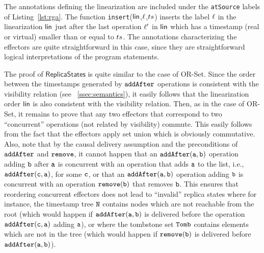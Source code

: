 The annotations defining the linearization are included under the
\lstinline|atSource| labels of Listing~\ref{lst:rga}. The function {\tt insert}($\mathsf{lin}$,$\ell$,$ts$) inserts the label $\ell$ in the linearization $\mathsf{lin}$ just after the last operation $\ell'$ in $\mathsf{lin}$ which has a timestamp (real or virtual) smaller than or equal to $ts$. The annotations characterizing the effectors are quite straightforward in this case, since they are straightforward logical interpretations of the program statements.

The proof of $\mathsf{ReplicaStates}$ is quite similar to the case of
OR-Set. Since the order between the timestamps generated by ${\tt
  addAfter}$ operations is consistent with the visibility relation
(see \sectionautorefname~\ref{ssec:semantics}), it easily follows that
the linearization order $\mathsf{lin}$ is also consistent with the
visibility relation. Then, as in the case of OR-Set, it remains to
prove that any two effectors that correspond to two ``concurrent''
operations (not related by visibility) commute. This easily follows
from the fact that the effectors apply set union which is obviously
commutative. Also, note that by the causal delivery assumption and the
preconditions of ${\tt addAfter}$ and ${\tt remove}$, it cannot happen
that an $\alabelshort[{\tt addAfter}]{a,b}$ operation adding ${\tt b}$
after ${\tt a}$ is concurrent with an operation that adds ${\tt a}$ to
the list, i.e., $\alabelshort[{\tt addAfter}]{c,a}$, for some ${\tt
  c}$, or that an $\alabelshort[{\tt addAfter}]{a,b}$ operation adding
${\tt b}$ is concurrent with an operation $\alabelshort[{\tt
  remove}]{b}$ that removes ${\tt b}$. This ensures that reordering
concurrent effectors does not lead to ``invalid'' replica states where for instance, the timestamp tree ${\tt N}$ contains nodes which are not reachable from the root (which would happen if $\alabelshort[{\tt addAfter}]{a,b}$ is delivered before the operation $\alabelshort[{\tt addAfter}]{c,a}$ adding ${\tt a}$), or where the tombstone set ${\tt Tomb}$ contains elements which are not in the tree (which would happen if $\alabelshort[{\tt remove}]{b}$ is delivered before $\alabelshort[{\tt addAfter}]{a,b}$).

